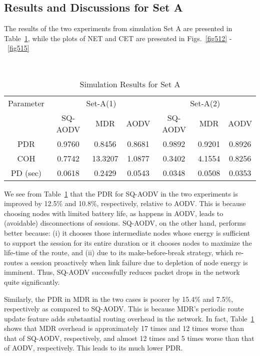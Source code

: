 \subsection{Results and Discussions for Set A}
\label{results-seta}

The results of the two experiments from simulation Set A are presented in Table~\ref{tab56}, while the plots of NET and CET are presented in Figs.~\ref{fig512} -~\ref{fig515}

\begin{table}[htbp]
\centering
\caption{Simulation Results for Set A}
\hfill \\
\begin{tabular}{|c|c|c|c|c|c|c|}
\hline
Parameter  & \multicolumn{3}{c|}{Set-A(1)} & \multicolumn{3}{c|}{Set-A(2)} \\
\        & SQ-AODV & MDR & AODV & SQ-AODV & MDR & AODV  \\
\hline
PDR            & 0.9760   & 0.8456   & 0.8681 & 0.9892   & 0.9201   & 0.8926 \\
\hline
COH            & 0.7742   & 13.3207  & 1.0877 & 0.3402   & 4.1554   & 0.8256 \\
\hline
PD (sec)       & 0.0618   & 0.2429   & 0.0543 & 0.0348   & 0.0508   & 0.0353 \\
\hline
\end{tabular}
\label{tab56}
\end{table}

We see from Table~\ref{tab56} that the PDR for SQ-AODV in the two experiments is improved by 12.5\% and 10.8\%, respectively, relative to AODV. This is because choosing nodes with limited battery life, as happens in AODV, leads to (avoidable) disconnections of sessions. SQ-AODV, on the other hand, performs better because: (i) it chooses those intermediate nodes whose energy is sufficient to support the session for its entire duration or it chooses nodes to maximize the life-time of the route, and (ii) due to its make-before-break strategy, which re-routes a session proactively when link failure due to depletion of node energy is imminent. Thus, SQ-AODV successfully reduces packet drops in the network quite significantly.

Similarly, the PDR in MDR in the two cases is poorer by 15.4\% and 7.5\%, respectively as compared to SQ-AODV. This is because MDR's periodic route update feature adds substantial routing overhead in the network. In fact,  Table~\ref{tab56} shows that MDR overhead is approximately 17 times and 12 times worse than that of SQ-AODV, respectively, and  almost 12 times and 5 times worse than that of AODV, respectively. This leads to its much lower PDR.

